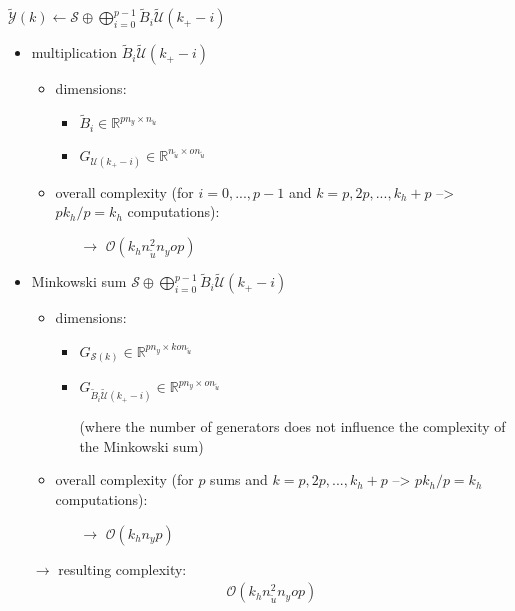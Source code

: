 \documentclass{article}
\begin{document}
$\tilde{\mathcal{Y}}(k) \gets{\mathcal{S}}\oplus \bigoplus_{i=0}^{p-1}  \tilde{B}_{i} \tilde{\mathcal{U}}(k_+-i)$ 
\begin{itemize}
    \item multiplication $\tilde{B}_{i} \tilde{\mathcal{U}}(k_+-i)$
    \begin{itemize}
        \item dimensions:
        \begin{itemize}
            \item $\tilde{B}_{i} \in \mathbb{R}^{pn_y \times n_{\tilde{u}}}$
            \item $G_{\mathcal{U}(k_+-i)} \in \mathbb{R}^{n_{\tilde{u}} \times o n_{\tilde{u}}}$
        \end{itemize}
        \item overall complexity (for $i=0,...,p-1$ and $k=p, 2p, ..., k_h+p$ --> $pk_h/p=k_h$ computations):
        \begin{itemize}
            \item[$\rightarrow$] $\mathcal{O}(k_h n_{\tilde{u}}^2 n_y o p)$
        \end{itemize}
    \end{itemize}
    \item Minkowski sum $\mathcal{S}\oplus \bigoplus_{i=0}^{p-1}  \tilde{B}_{i} \tilde{\mathcal{U}}(k_+-i)$
    \begin{itemize}
        \item dimensions:
        \begin{itemize}
            \item $G_{\mathcal{S}(k)} \in \mathbb{R}^{pn_y \times k o n_{\tilde{u}}}$
            \item $G_{\tilde{B}_{i} \tilde{\mathcal{U}}(k_+-i)} \in \mathbb{R}^{pn_y \times on_{\tilde{u}}}$ 
            \item[] (where the number of generators does not influence the complexity of the Minkowski sum)
        \end{itemize}
        \item overall complexity (for $p$ sums and $k=p, 2p, ..., k_h+p$ --> $pk_h/p=k_h$ computations):
        \begin{itemize}
            \item[$\rightarrow$] $\mathcal{O}(k_h n_y p)$
        \end{itemize}
    \end{itemize}    
    \item[$\rightarrow$] resulting complexity: \begin{align*}
        \mathcal{O}(k_h n_{\tilde{u}}^2 n_y o p)
    \end{align*}
\end{itemize}
\end{document}
